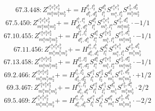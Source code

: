\documentclass[letterpaper,10pt,fleqn,leqno,onecolumn]{article}
\begin{document}
\begin{equation} \;\;\;\;\;\;  67.3.448: Z^{e_{1}^{a}e_{1}^{b}e_{2}^{b}}_{m_{1}^{a}m_{1}^{b}m_{2}^{b}}+=H^{l_{1}^{b},l_{2}^{b}}_{d_{1}^{b},d_{2}^{b}}S^{d_{1}^{b}}_{l_{1}^{b}}S^{e_{1}^{a}e_{1}^{b}}_{m_{1}^{a},l_{2}^{b}}S^{e_{2}^{b},d_{2}^{b}}_{m_{1}^{b}m_{2}^{b}} \end{equation}
\begin{equation} \;\;\;\;\;\;  67.5.450: Z^{e_{1}^{a}e_{1}^{b}e_{2}^{b}}_{m_{1}^{a}m_{1}^{b}m_{2}^{b}}+=H^{l_{1}^{b},l_{1}^{a}}_{d_{1}^{b},d_{1}^{a}}S^{d_{1}^{b}}_{l_{1}^{b}}S^{e_{1}^{a}e_{1}^{b}}_{m_{1}^{b},l_{1}^{a}}S^{e_{2}^{b},d_{1}^{a}}_{m_{1}^{a}m_{2}^{b}}\cdot -1/1 \end{equation}
\begin{equation} \;\;\;\;\;\;  67.10.455: Z^{e_{1}^{a}e_{1}^{b}e_{2}^{b}}_{m_{1}^{a}m_{1}^{b}m_{2}^{b}}+=H^{l_{1}^{a},l_{1}^{b}}_{d_{1}^{a},d_{1}^{b}}S^{d_{1}^{a}}_{l_{1}^{a}}S^{e_{1}^{b}e_{2}^{b}}_{m_{1}^{b},l_{1}^{b}}S^{e_{1}^{a},d_{1}^{b}}_{m_{1}^{a}m_{2}^{b}}\cdot -1/1 \end{equation}
\begin{equation} \;\;\;\;\;\;  67.11.456: Z^{e_{1}^{a}e_{1}^{b}e_{2}^{b}}_{m_{1}^{a}m_{1}^{b}m_{2}^{b}}+=H^{l_{1}^{a},l_{1}^{b}}_{d_{1}^{a},d_{1}^{b}}S^{d_{1}^{a}}_{l_{1}^{a}}S^{e_{1}^{a}e_{1}^{b}}_{m_{1}^{a},l_{1}^{b}}S^{e_{2}^{b},d_{1}^{b}}_{m_{1}^{b}m_{2}^{b}} \end{equation}
\begin{equation} \;\;\;\;\;\;  67.13.458: Z^{e_{1}^{a}e_{1}^{b}e_{2}^{b}}_{m_{1}^{a}m_{1}^{b}m_{2}^{b}}+=H^{l_{1}^{a},l_{2}^{a}}_{d_{1}^{a},d_{2}^{a}}S^{d_{1}^{a}}_{l_{1}^{a}}S^{e_{1}^{a}e_{1}^{b}}_{m_{1}^{b},l_{2}^{a}}S^{e_{2}^{b},d_{2}^{a}}_{m_{1}^{a}m_{2}^{b}}\cdot -1/1 \end{equation}
\begin{equation} \;\;\;\;\;\;  69.2.466: Z^{e_{1}^{a}e_{1}^{b}e_{2}^{b}}_{m_{1}^{a}m_{1}^{b}m_{2}^{b}}+=H^{l_{1}^{b},l_{2}^{b}}_{d_{1}^{b},d_{2}^{b}}S^{e_{1}^{b}}_{l_{1}^{b}}S^{e_{2}^{b}}_{l_{2}^{b}}S^{d_{1}^{b}}_{m_{1}^{b}}S^{e_{1}^{a},d_{2}^{b}}_{m_{1}^{a}m_{2}^{b}}\cdot +1/2 \end{equation}
\begin{equation} \;\;\;\;\;\;  69.3.467: Z^{e_{1}^{a}e_{1}^{b}e_{2}^{b}}_{m_{1}^{a}m_{1}^{b}m_{2}^{b}}+=H^{l_{1}^{a},l_{1}^{b}}_{d_{1}^{b},d_{1}^{a}}S^{e_{1}^{a}}_{l_{1}^{a}}S^{e_{1}^{b}}_{l_{1}^{b}}S^{d_{1}^{b}}_{m_{1}^{b}}S^{e_{2}^{b},d_{1}^{a}}_{m_{1}^{a}m_{2}^{b}}\cdot 2/2 \end{equation}
\begin{equation} \;\;\;\;\;\;  69.5.469: Z^{e_{1}^{a}e_{1}^{b}e_{2}^{b}}_{m_{1}^{a}m_{1}^{b}m_{2}^{b}}+=H^{l_{1}^{a},l_{1}^{b}}_{d_{1}^{a},d_{1}^{b}}S^{e_{1}^{a}}_{l_{1}^{a}}S^{e_{1}^{b}}_{l_{1}^{b}}S^{d_{1}^{a}}_{m_{1}^{a}}S^{e_{2}^{b},d_{1}^{b}}_{m_{1}^{b}m_{2}^{b}}\cdot -2/2 \end{equation}
\end{document}
